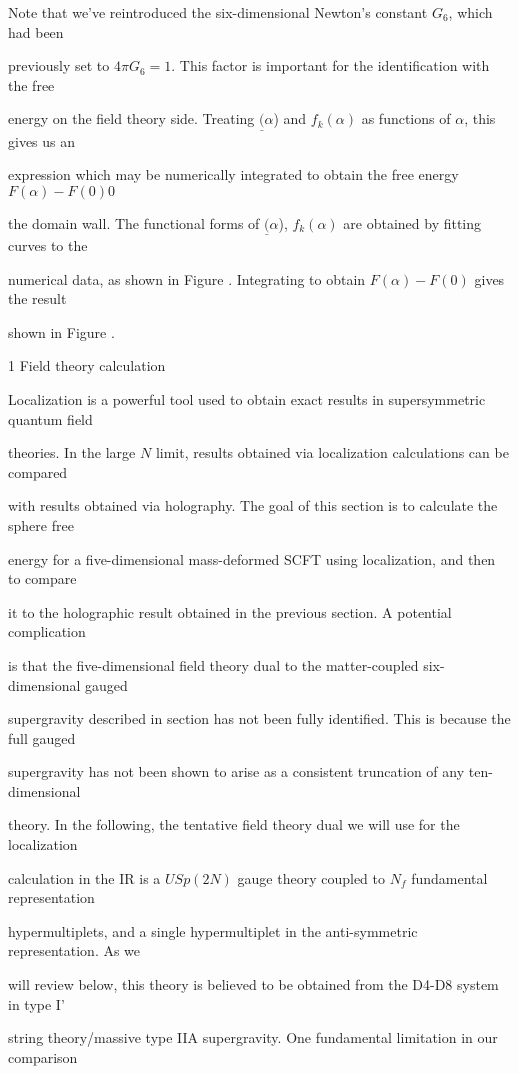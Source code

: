 \documentclass[a4paper,12pt]{article}
\begin{document}
Note that we've reintroduced the six-dimensional Newton's constant $G_{6}$, which had been

previously set to $4\pi G_{6} = 1$. This factor is important for the identification with the free

energy on the field theory side. Treating $\underline{(}\alpha$) and $f_{k}(\alpha)$ as functions of $\alpha$, this gives us an

expression which may be numerically integrated to obtain the free energy $F(\alpha) -F(0) 0$

the domain wall. The functional forms of $\underline{(}\alpha$), $f_{k}(\alpha)$ are obtained by fitting curves to the

numerical data, as shown in Figure . Integrating to obtain $F(\alpha) -F(0)$ gives the result

shown in Figure .

1 Field theory calculation

Localization is a powerful tool used to obtain exact results in supersymmetric quantum field

theories. In the large $N$ limit, results obtained via localization calculations can be compared

with results obtained via holography. The goal of this section is to calculate the sphere free

energy for a five-dimensional mass-deformed SCFT using localization, and then to compare

it to the holographic result obtained in the previous section. A potential complication

is that the five-dimensional field theory dual to the matter-coupled six-dimensional gauged

supergravity described in section has not been fully identified. This is because the full gauged

supergravity has not been shown to arise as a consistent truncation of any ten-dimensional

theory. In the following, the tentative field theory dual we will use for the localization

calculation in the IR is a $USp(2N)$ gauge theory coupled to $N_{f}$ fundamental representation

hypermultiplets, and a single hypermultiplet in the anti-symmetric representation. As we

will review below, this theory is believed to be obtained from the D4-D8 system in type I'

string theory/massive type IIA supergravity. One fundamental limitation in our comparison
\end{document}
